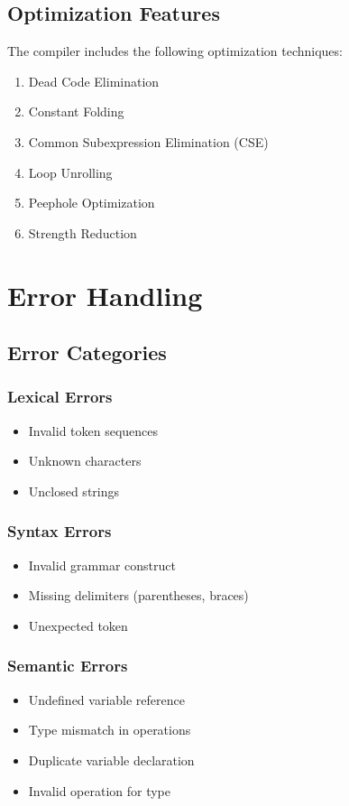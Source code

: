 \documentclass[12pt,a4paper]{report}
\begin{document}
\section{Optimization Features}

The compiler includes the following optimization techniques:

\begin{enumerate}
    \item Dead Code Elimination
    \item Constant Folding
    \item Common Subexpression Elimination (CSE)
    \item Loop Unrolling
    \item Peephole Optimization
    \item Strength Reduction
\end{enumerate}

\chapter{Error Handling}

\section{Error Categories}

\subsection{Lexical Errors}
\begin{itemize}
    \item Invalid token sequences
    \item Unknown characters
    \item Unclosed strings
\end{itemize}

\subsection{Syntax Errors}
\begin{itemize}
    \item Invalid grammar construct
    \item Missing delimiters (parentheses, braces)
    \item Unexpected token
\end{itemize}

\subsection{Semantic Errors}
\begin{itemize}
    \item Undefined variable reference
    \item Type mismatch in operations
    \item Duplicate variable declaration
    \item Invalid operation for type
\end{itemize}
\end{document}
